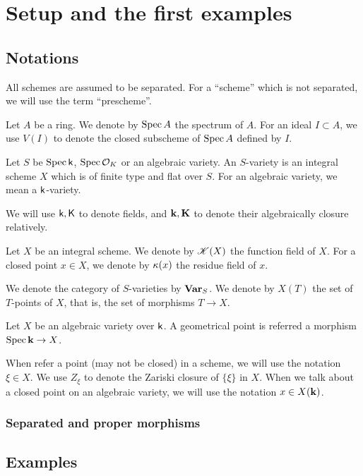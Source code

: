 \section{Setup and the first examples}
\subsection{Notations}

    All schemes are assumed to be separated.
    For a ``scheme'' which is not separated, we will use the term ``prescheme''.

    Let $A$ be a ring.
    We denote by $\operatorname{Spec} A$ the spectrum of $A$.
    For an ideal $I \subset A$, we use $V(I)$ to denote the closed subscheme of $\operatorname{Spec} A$ defined by $I$.
 
    Let $S$ be $\operatorname{Spec} {\mathsf{k}}$, $\operatorname{Spec} {\mathcal{O}}_K$ or an algebraic variety.
    An $S$-variety is an integral scheme $X$ which is of finite type and flat over $S$.
    For an algebraic variety, we mean a ${\mathsf{k}}$-variety.

    We will use ${\mathsf{k}},{\mathsf{K}}$ to denote fields, and ${\mathbf{k}},{\mathbf{K}}$ to denote their algebraically closure relatively.

    Let $X$ be an integral scheme.
    We denote by ${\mathscr{K}}(X)$ the function field of $X$.
    For a closed point $x \in X$, we denote by ${\kappa}(x)$ the residue field of $x$.

    We denote the category of $S$-varieties by $\mathbf{Var}_S$.
    We denote by $X(T)$ the set of $T$-points of $X$, that is, the set of morphisms $T \to X$.

    Let $X$ be an algebraic variety over ${\mathsf{k}}$.
    A geometrical point is referred a morphism $\operatorname{Spec} {\mathbf{k}} \to X$.

    When refer a point (may not be closed) in a scheme, we will use the notation $\xi \in X$.
    We use $Z_\xi$ to denote the Zariski closure of $\{\xi\}$ in $X$.
    When we talk about a closed point on an algebraic variety, we will use the notation $x \in X({\mathbf{k}})$.

    \subsubsection{Separated and proper morphisms}


\subsection{Examples}

